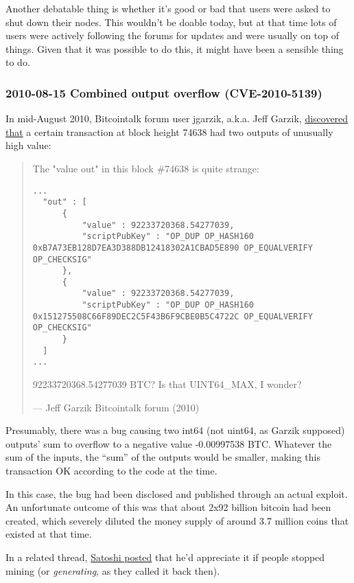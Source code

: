 Another debatable thing is whether it's good or bad that users were
asked to shut down their nodes. This wouldn't be doable today, but at
that time lots of users were actively following the forums for updates
and were usually on top of things. Given that it was possible to do
this, it might have been a sensible thing to do.

\hypertarget{combined-output-overflow}{%
\subsubsection{2010-08-15 Combined output overflow
(CVE-2010-5139)}\label{combined-output-overflow}}

In mid-August 2010, Bitcointalk forum user jgarzik, a.k.a. Jeff Garzik,
\href{https://bitcointalk.org/index.php?topic=822.msg9474\#msg9474}{discovered
that} a certain transaction at block height 74638 had two outputs of
unusually high value:

\begin{quote}
The "value out" in this block \#74638 is quite strange:

\begin{verbatim}
...
  "out" : [
      {
          "value" : 92233720368.54277039,
          "scriptPubKey" : "OP_DUP OP_HASH160 0xB7A73EB128D7EA3D388DB12418302A1CBAD5E890 OP_EQUALVERIFY OP_CHECKSIG"
      },
      {
          "value" : 92233720368.54277039,
          "scriptPubKey" : "OP_DUP OP_HASH160 0x151275508C66F89DEC2C5F43B6F9CBE0B5C4722C OP_EQUALVERIFY OP_CHECKSIG"
      }
  ]
...
\end{verbatim}

92233720368.54277039 BTC? Is that UINT64\_MAX, I wonder?

---  Jeff Garzik Bitcointalk forum (2010)
\end{quote}

Presumably, there was a bug causing two int64 (not uint64, as Garzik
supposed) outputs' sum to overflow to a negative value -0.00997538 BTC.
Whatever the sum of the inputs, the ``sum'' of the outputs would be
smaller, making this transaction OK according to the code at the time.

In this case, the bug had been disclosed and published through an actual
exploit. An unfortunate outcome of this was that about 2x92 billion
bitcoin had been created, which severely diluted the money supply of
around 3.7 million coins that existed at that time.

In a related thread,
\href{https://bitcointalk.org/index.php?topic=823.msg9531\#msg9531}{Satoshi
posted} that he'd appreciate it if people stopped mining (or
\emph{generating}, as they called it back then).

